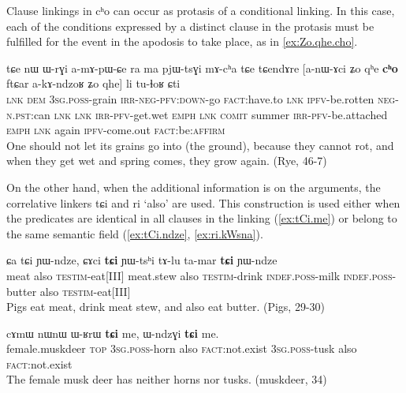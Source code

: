 \documentclass[oldfontcommands,oneside,a4paper,11pt]{article}
\newcommand{\ipa}[1]{{\phon \mbox{#1}}} %
\begin{document}
Clause linkings in \ipa{cʰo} can occur as protasis of a conditional linking. In this case, each of the conditions expressed by a distinct clause in the protasis must be fulfilled for the event in the apodosis to take place, as in \ref{ex:Zo.qhe.cho}.

\begin{exe}
\ex \label{ex:Zo.qhe.cho}
\gll
\ipa{tɕe}  	\ipa{nɯ}  	\ipa{ɯ-rɣi}  	\ipa{a-mɤ-pɯ-ɕe}  	\ipa{ra}  	\ipa{ma}  	\ipa{pjɯ-tsɣi}  	\ipa{mɤ-cʰa}  	\ipa{tɕe}  \ipa{tɕendɤre}  	[\ipa{a-nɯ-ɤci}  	\ipa{ʑo}  	\ipa{qʰe}  	\ipa{\textbf{cʰo}}  	\ipa{ftɕar}  	\ipa{a-kɤ-ndzoʁ}  	\ipa{ʑo}  	\ipa{qhe}]  	\ipa{li}  	\ipa{tu-ɬoʁ}  	\ipa{ɕti}  \\
\textsc{lnk} \textsc{dem} \textsc{3sg.poss}-grain \textsc{irr-neg-pfv:down}-go \textsc{fact}:have.to \textsc{lnk} \textsc{ipfv}-be.rotten \textsc{neg-n.pst}:can \textsc{lnk} \textsc{lnk} \textsc{irr-pfv}-get.wet \textsc{emph} \textsc{lnk} \textsc{comit} summer \textsc{irr-pfv}-be.attached \textsc{emph} \textsc{lnk} again \textsc{ipfv}-come.out \textsc{fact}:be:\textsc{affirm}\\
\glt One should not let its grains go into (the ground), because they cannot rot, and when they get wet and   spring comes, they grow again. (Rye, 46-7)
\end{exe}




On the other hand, when the additional information is on the arguments, the correlative linkers \ipa{tɕi} and \ipa{ri} `also' are used. This construction is used either when the predicates are identical in all clauses in the linking (\ref{ex:tCi.me}) or belong to the same semantic field (\ref{ex:tCi.ndze}, \ref{ex:ri.kWsna}).

 \begin{exe}
\ex \label{ex:tCi.ndze}
\gll
\ipa{ɕa}  	\ipa{tɕi}  	\ipa{ɲɯ-ndze,}  	\ipa{ɕɤci}  	\ipa{\textbf{tɕi}}  	\ipa{ɲɯ-tsʰi}  	\ipa{tɤ-lu}  	\ipa{ta-mar}  	\ipa{\textbf{tɕi}}  	\ipa{ɲɯ-ndze}  \\
meat also \textsc{testim}-eat[III] meat.stew also \textsc{testim}-drink  \textsc{indef.poss}-milk \textsc{indef.poss}-butter also \textsc{testim}-eat[III] \\
\glt  Pigs eat meat, drink meat stew, and also eat butter. (Pigs, 29-30)
\end{exe}


 \begin{exe}
\ex \label{ex:tCi.me}
\gll
\ipa{cɤmɯ}  	\ipa{nɯnɯ}  	\ipa{ɯ-ʁrɯ}  	\ipa{\textbf{tɕi}}  	\ipa{me,}  	\ipa{ɯ-ndzɣi}  	\ipa{\textbf{tɕi}}  	\ipa{me.}  \\
female.muskdeer \textsc{top} \textsc{3sg.poss}-horn also \textsc{fact}:not.exist \textsc{3sg.poss}-tusk also \textsc{fact}:not.exist \\
\glt The female musk deer has neither horns nor tusks.  (muskdeer, 34)
\end{exe}
\end{document}
